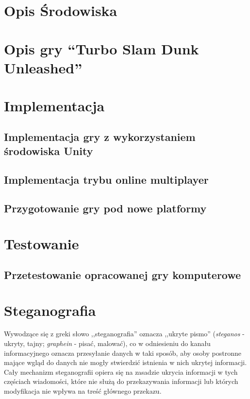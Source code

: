 \documentclass[a4paper,12pt,twoside,openany]{report}
\begin{document}
\chapter{Opis Środowiska}

\chapter{Opis gry “Turbo Slam Dunk Unleashed”}

\chapter{Implementacja}

\section{Implementacja gry z wykorzystaniem środowiska Unity}

\section{Implementacja trybu online multiplayer}

\section{Przygotowanie gry pod nowe platformy}

\chapter{Testowanie}

\section{Przetestowanie opracowanej gry komputerowe}

\iffalse
\chapter{Steganografia}
Wywodzące się z greki słowo ,,steganografia'' oznacza ,,ukryte pismo'' 
(\textit{steganos} - ukryty, tajny; \textit{graphein} - pisać, malować), co w 
odniesieniu do kanału informacyjnego oznacza przesyłanie danych w taki sposób, 
aby osoby postronne mające wgląd do danych nie mogły stwierdzić istnienia w nich 
ukrytej informacji. Cały mechanizm steganografii opiera się na zasadzie ukrycia 
informacji w tych częściach wiadomości, które nie służą do przekazywania 
informacji lub których modyfikacja nie wpływa na treść głównego przekazu.
\end{document}
